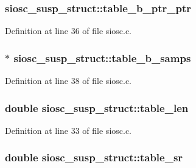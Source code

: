 \subsubsection[{\texorpdfstring{table\+\_\+b\+\_\+ptr\+\_\+ptr}{table_b_ptr_ptr}}]{ siosc\+\_\+susp\+\_\+struct\+::table\+\_\+b\+\_\+ptr\+\_\+ptr}\hypertarget{structsiosc__susp__struct_a65604f925d0d3ab93b8c740277e20ab1}{}\label{structsiosc__susp__struct_a65604f925d0d3ab93b8c740277e20ab1}


Definition at line 36 of file siosc.\+c.

\subsubsection[{\texorpdfstring{table\+\_\+b\+\_\+samps}{table_b_samps}}]{$\ast$ siosc\+\_\+susp\+\_\+struct\+::table\+\_\+b\+\_\+samps}\hypertarget{structsiosc__susp__struct_a15a851e0715230335485916e97e76c6e}{}\label{structsiosc__susp__struct_a15a851e0715230335485916e97e76c6e}


Definition at line 38 of file siosc.\+c.

\subsubsection[{\texorpdfstring{table\+\_\+len}{table_len}}]{\setlength{\rightskip}{0pt plus 5cm}double siosc\+\_\+susp\+\_\+struct\+::table\+\_\+len}\hypertarget{structsiosc__susp__struct_a26dc911eb3bea05ecd121e212b91ba23}{}\label{structsiosc__susp__struct_a26dc911eb3bea05ecd121e212b91ba23}


Definition at line 33 of file siosc.\+c.

\subsubsection[{\texorpdfstring{table\+\_\+sr}{table_sr}}]{\setlength{\rightskip}{0pt plus 5cm}double siosc\+\_\+susp\+\_\+struct\+::table\+\_\+sr}\hypertarget{structsiosc__susp__struct_a70e2bd293641d2c36564b247856e9f6e}{}\label{structsiosc__susp__struct_a70e2bd293641d2c36564b247856e9f6e}


